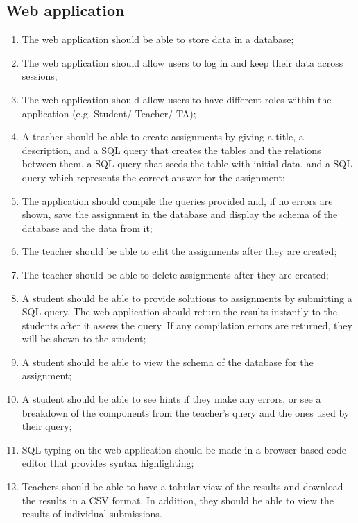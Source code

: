 \subsection{Web application}
\begin{enumerate}[label=R-\arabic*]
  \item The web application should be able to store data in a database;
  \item The web application should allow users to log in and keep their data
    across sessions;
  \item The web application should allow users to have different roles within the
    application (e.g. Student/ Teacher/ TA);
  \item  A teacher should be able to create assignments by giving a title, a description, and a SQL query that creates the tables and the relations between them, a SQL query that seeds the table with initial data, and a SQL query which represents the correct answer for the assignment;
  \item The application should compile the queries provided and, if no errors are shown, save the assignment in the database and display the schema of the database and the data from it;
  \item The teacher should be able to edit the assignments after they are created;
  \item The teacher should be able to delete assignments after they are created;
  \item A student should be able to provide solutions to assignments by submitting a SQL query. The web application should return the results instantly to the students after it assess the query. If any compilation errors are returned, they will be shown to the student;
  \item A student should be able to view the schema of the database for the assignment;
  \item A student should be able to see hints if they make any errors, or see a breakdown of the components from the teacher's query and the ones used by their query;
  \item SQL typing on the web application should be made in a browser-based code editor that provides syntax highlighting;
  \item Teachers should be able to have a tabular view of the results and download the results in a CSV format. In addition, they should be able to view the results of individual submissions.
\end{enumerate}

